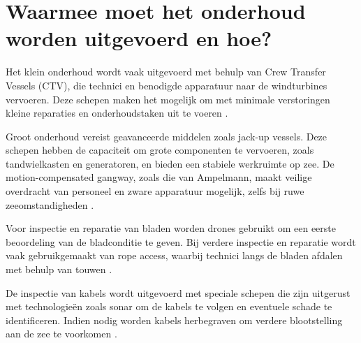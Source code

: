 \section{Waarmee moet het onderhoud worden uitgevoerd en hoe?}

Het klein onderhoud wordt vaak uitgevoerd met behulp van Crew Transfer Vessels (CTV), die technici en benodigde apparatuur naar de windturbines vervoeren. Deze schepen maken het mogelijk om met minimale verstoringen kleine reparaties en onderhoudstaken uit te voeren \cite{Eneco_presentatie}.

Groot onderhoud vereist geavanceerde middelen zoals jack-up vessels. Deze schepen hebben de capaciteit om grote componenten te vervoeren, zoals tandwielkasten en generatoren, en bieden een stabiele werkruimte op zee. De motion-compensated gangway, zoals die van Ampelmann, maakt veilige overdracht van personeel en zware apparatuur mogelijk, zelfs bij ruwe zeeomstandigheden \cite{Eneco_presentatie}.

Voor inspectie en reparatie van bladen worden drones gebruikt om een eerste beoordeling van de bladconditie te geven. Bij verdere inspectie en reparatie wordt vaak gebruikgemaakt van rope access, waarbij technici langs de bladen afdalen met behulp van touwen \cite{Eneco_presentatie}.

De inspectie van kabels wordt uitgevoerd met speciale schepen die zijn uitgerust met technologieën zoals sonar om de kabels te volgen en eventuele schade te identificeren. Indien nodig worden kabels herbegraven om verdere blootstelling aan de zee te voorkomen \cite{Eneco_presentatie}.

